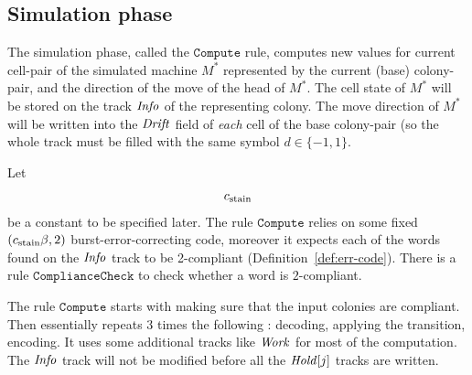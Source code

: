 \documentclass[11pt]{memoir}
\theoremstyle{definition} %
\newcommand{\fld}[1]{\ensuremath{\textit{#1\/}}}
\newcommand{\rul}[1]{\ensuremath{\texttt{#1}}}
\newcommand{\Drift}{\fld{Drift}}
\newcommand{\Hold}{\fld{Hold}}
\newcommand{\Info}{\fld{Info}}
\newcommand{\Work}{\fld{Work}} %
\newcommand{\Compute}{\rul{Compute}}
\newcommand{\cns}[1]{c_{\textrm{\upshape #1}}}
\begin{document}
\subsection{Simulation phase}\label{sec:simulation-phase}

The simulation phase, called the \( \Compute \) rule, computes new values for current cell-pair of the
simulated machine \( M^{*} \) represented by the current (base) colony-pair,
and the direction of the move of the head of  \( M^{*} \).
The cell state of \( M^{*} \) will be stored on the track \( \Info \) of the
representing colony.
The move direction of \( M^{*} \) 
will be written into the \( \Drift \) field of \emph{each} cell of the base colony-pair
(so the whole track must be filled with the same symbol \( d\in\{-1,1\} \).

Let
\begin{align}\label{eq:stain}
   \cns{stain} 
\end{align}
be a constant to be specified later.
The rule \( \Compute \) relies on some fixed \( (\cns{stain}\beta, 2) \) burst-error-correcting
code, moreover it expects each of the words found on the \( \Info \) track to be
2-compliant (Definition~\ref{def:err-code}).
There is a rule \( \rul{ComplianceCheck} \) to check whether a word is \( 2 \)-compliant.

The rule \( \Compute \) starts with making sure that the input colonies
are compliant.
Then essentially repeats 3 times
the following : decoding, applying the transition, encoding.
It uses some additional tracks like \( \Work \) for most of the computation.
 The \( \Info \) track will not be modified before all the \( \Hold[j] \) tracks are written.
\end{document}
